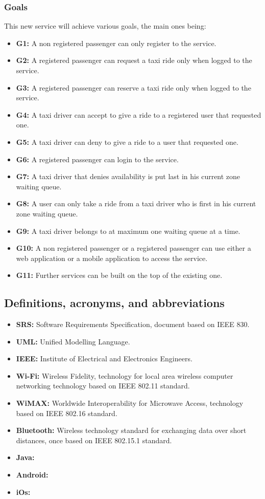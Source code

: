 \subsubsection{Goals}
This new service will achieve various goals, the main ones being:
\begin{itemize}
	\item\textbf{G1:} A non registered passenger can only register to the service.
	\item\textbf{G2:} A registered passenger can request a taxi ride only when logged to the service.
	\item\textbf{G3:} A registered passenger can reserve a taxi ride only when logged to the service.
	\item\textbf{G4:} A taxi driver can accept to give a ride to a registered user that requested one.
	\item\textbf{G5:} A taxi driver can deny to give a ride to a user that requested one.
	\item\textbf{G6:} A registered passenger can login to the service.
	\item\textbf{G7:} A taxi driver that denies availability is put last in his current zone waiting queue.
	\item\textbf{G8:} A user can only take a ride from a taxi driver who is first in his current zone waiting queue.
	\item\textbf{G9:} A taxi driver belongs to at maximum one waiting queue at a time.
	\item\textbf{G10:} A non registered passenger or a registered passenger can use either a web application or a mobile application to access the service.
	\item\textbf{G11:} Further services can be built on the top of the existing one.
\end{itemize}
\subsection{Definitions, acronyms, and abbreviations}
\begin{itemize}
	\item \textbf{SRS:} Software Requirements Specification, document based on IEEE 830.
	\item\textbf{UML:} Unified Modelling Language.
	\item\textbf{IEEE:} Institute of Electrical and Electronics Engineers.
	\item\textbf{Wi-Fi:} Wireless Fidelity, technology for local area wireless computer networking technology based on IEEE 802.11 standard.
	\item\textbf{WiMAX:} Worldwide Interoperability for Microwave Access, technology based on IEEE 802.16 standard.
	\item\textbf{Bluetooth:} Wireless technology standard for exchanging data over short distances, once based on IEEE 802.15.1 standard.
	\item\textbf{Java:}
	\item\textbf{Android:}
	\item\textbf{iOs:}
\end{itemize}
